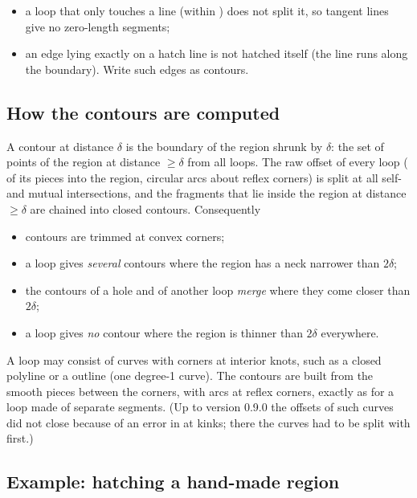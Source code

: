 \begin{itemize}
\item a loop that only touches a line (within ) does not split it, so tangent
lines give no zero-length segments;
\item an edge lying exactly on a hatch line is not hatched itself (the line runs along the
boundary). Write such edges as contours.
\end{itemize}

\subsection{How the contours are computed}

A contour at distance $\delta$ is the boundary of the region shrunk by $\delta$: the set of
points of the region at distance $\ge\delta$ from all loops. The raw offset of every loop
( of its pieces into the region, circular arcs about reflex corners) is
split at all self- and mutual intersections, and the fragments that lie inside the region at
distance $\ge\delta$ are chained into closed contours. Consequently
\begin{itemize}
\item contours are trimmed at convex corners;
\item a loop gives \emph{several} contours where the region has a neck narrower than
$2\delta$;
\item the contours of a hole and of another loop \emph{merge} where they come closer than
$2\delta$;
\item a loop gives \emph{no} contour where the region is thinner than $2\delta$ everywhere.
\end{itemize}

\begin{note}
A loop may consist of curves with corners at interior knots, such as a closed polyline or a
 outline (one degree-1 curve). The contours are built from the smooth
pieces between the corners, with arcs at reflex corners, exactly as for a loop made of separate
segments. (Up to version 0.9.0 the offsets of such curves did not close because of an error in
 at kinks; there the curves had to be split with
 first.)
\end{note}

\subsection{Example: hatching a hand-made region}

